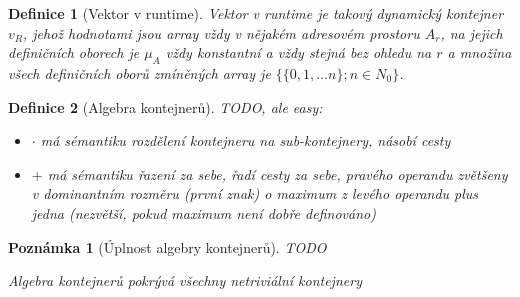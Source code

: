 \documentclass[a4paper,12pt]{article}
\newtheorem{definition}{Definice}[section]
\newtheorem{corollary}{Poznámka}[definition]
\begin{document}
\begin{definition}[Vektor v runtime]
    Vektor v runtime je takový dynamický kontejner $v_R$, jehož hodnotami jsou array vždy v nějakém adresovém prostoru $A_r$, na jejich definičních oborech je $\mu_A$ vždy konstantní a vždy stejná bez ohledu na $r$ a množina všech definičních oborů zmíněných array je $\{\{0,1,\dots n\}; n \in N_0\}$.
\end{definition}

\begin{definition}[Algebra kontejnerů]
    TODO, ale easy:

    \begin{itemize}
        \item $\cdot$ má sémantiku rozdělení kontejneru na sub-kontejnery, násobí cesty
        \item $+$ má sémantiku řazení za sebe, řadí cesty za sebe, pravého operandu zvětšeny v dominantním rozměru (první znak) o maximum z levého operandu plus jedna (nezvětší, pokud maximum není dobře definováno)
    \end{itemize}
\end{definition}

\begin{corollary}[Úplnost algebry kontejnerů]
    TODO

    Algebra kontejnerů pokrývá všechny netriviální kontejnery
\end{corollary}
\end{document}
